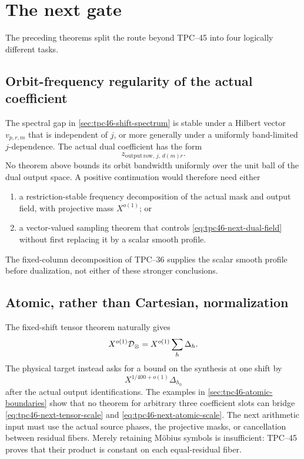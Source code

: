 \section{The next gate}
\label{sec:tpc46-next-gate}

The preceding theorems split the route beyond TPC--45 into four
logically different tasks.

\subsection{Orbit-frequency regularity of the actual coefficient}

The spectral gap in \cref{sec:tpc46-shift-spectrum} is stable under a
Hilbert vector \(v_{p,r,m}\) that is independent of \(j\), or more
generally under a uniformly band-limited \(j\)-dependence.  The actual
dual coefficient has the form
\begin{equation}
 z_{\mathrm{output\ row},\,j,\,d(m)r}.
 \label{eq:tpc46-next-dual-field}
\end{equation}
No theorem above bounds its orbit bandwidth uniformly over the unit
ball of the dual output space.  A positive continuation would therefore
need either
\begin{enumerate}[label=\textup{(\roman*)},leftmargin=2.4em]
 \item a restriction-stable frequency decomposition of the actual mask
       and output field, with projective mass \(X^{o(1)}\); or
 \item a vector-valued sampling theorem that controls
       \eqref{eq:tpc46-next-dual-field} without first replacing it by a
       scalar smooth profile.
\end{enumerate}
The fixed-column decomposition of TPC--36 supplies the scalar smooth
profile before dualization, not either of these stronger conclusions.

\subsection{Atomic, rather than Cartesian, normalization}

The fixed-shift tensor theorem naturally gives
\begin{equation}
 X^{o(1)}\mathcal D_\otimes
 =X^{o(1)}\sum_h\Delta_h.
 \label{eq:tpc46-next-tensor-scale}
\end{equation}
The physical target instead asks for a bound on the synthesis at one
shift by
\begin{equation}
 X^{1/400+o(1)}\Delta_{h_0}
 \label{eq:tpc46-next-atomic-scale}
\end{equation}
after the actual output identifications.  The examples in
\cref{sec:tpc46-atomic-boundaries} show that no theorem for arbitrary
three coefficient slots can bridge
\eqref{eq:tpc46-next-tensor-scale} and
\eqref{eq:tpc46-next-atomic-scale}.  The next arithmetic input must use
the actual source phases, the projective masks, or cancellation between
residual fibers.  Merely retaining M\"obius symbols is insufficient:
TPC--45 proves that their product is constant on each equal-residual
fiber.

